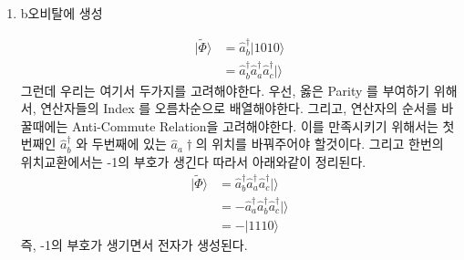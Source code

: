 \documentclass[11pt]{article}
\begin{document}
\begin{enumerate}[label=\(\mathrm{i}\))]
\item {b오비탈에 생성}

\begin{align*}
| \tilde{\Phi }\rangle & = \hat{a}_b^{\dagger}\vert 1010 \rangle \\
& = \hat{a}_b^{\dagger}\hat{a}_a^{\dagger}\hat{a}_c^{\dagger} \vert \rangle 
\end{align*}
그런데 우리는 여기서 두가지를 고려해야한다. 우선, 옳은 Parity 를 부여하기 위해서, 연산자들의 Index 를 오름차순으로 배열해야한다. 
그리고, 연산자의 순서를 바꿀때에는 Anti-Commute Relation을 고려해야한다. 
이를 만족시키기 위해서는 첫번째인 \(\hat{a}_b^{\dagger}\) 와 두번째에 있는 \(\hat{a}_a{\dagger}\)의 위치를 바꿔주어야 할것이다. 
그리고 한번의 위치교환에서는 -1의 부호가 생긴다 따라서 아래와같이 정리된다. 
\begin{align*}
| \tilde{\Phi }\rangle & = \hat{a}_b^{\dagger}\hat{a}_a^{\dagger}\hat{a}_c^{\dagger} \vert \rangle  \\
& = -\hat{a}_a^{\dagger}\hat{a}_b^{\dagger}\hat{a}_c^{\dagger} \vert \rangle \\
& = -\vert 1110 \rangle
\end{align*}
즉, -1의 부호가 생기면서 전자가 생성된다. 

\end{enumerate}
\end{document}
